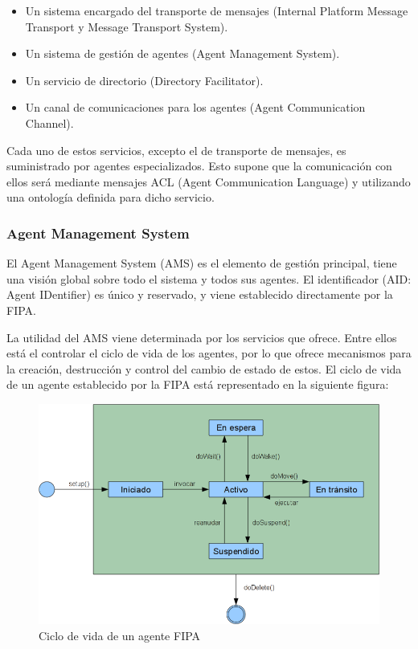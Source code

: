 \begin{itemize}
 \item Un sistema encargado del transporte de mensajes (Internal Platform
 Message Transport y Message Transport System).
 \item Un sistema de gestión de agentes (Agent Management System).
 \item Un servicio de directorio (Directory Facilitator).
 \item Un canal de comunicaciones para los agentes (Agent Communication
 Channel).
\end{itemize}

Cada uno de estos servicios, excepto el de transporte de mensajes, es
suministrado por agentes especializados. Esto supone que la comunicación con
ellos será mediante mensajes ACL (Agent Communication Language) y utilizando una
ontología definida para dicho servicio.

\subsubsection*{Agent Management System}

El Agent Management System (AMS) es el elemento de gestión principal, tiene una
visión global sobre todo el sistema y todos sus agentes. El identificador (AID:
Agent IDentifier) es único y reservado, y viene establecido directamente por la
FIPA.

La utilidad del AMS viene determinada por los servicios que ofrece. Entre ellos
está el controlar el ciclo de vida de los agentes, por lo que ofrece mecanismos
para la creación, destrucción y control del cambio de estado de estos. El ciclo
de vida de un agente establecido por la FIPA está representado en la siguiente
figura:

\begin{figure}[H]
 \centering
 \includegraphics[width=130mm]{figuras/cap4/fipa_agent.png}
 \caption{Ciclo de vida de un agente FIPA}
\end{figure}

